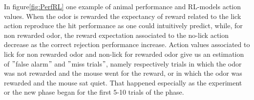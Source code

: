 In figure\ref{fig:PerfRL} one example of animal performance and RL-models action values. When the odor is rewarded the expectancy of reward related to the lick action reproduce the hit performance as one could intuitively predict, while, for non rewarded odor, the reward expectation associated to the no-lick action decrease as the correct rejection performance increase. Action values associated to lick for non rewarded odor and non-lick for rewarded odor give us an estimation of $"$false alarm$"$ and $"$miss trials$"$, namely respectively trials in which the odor was not rewarded and the mouse went for the reward, or in which the odor was rewarded and the mouse sat quiet. That happened especially as the experiment or the new phase began for the first 5-10 trials of the phase.\\
